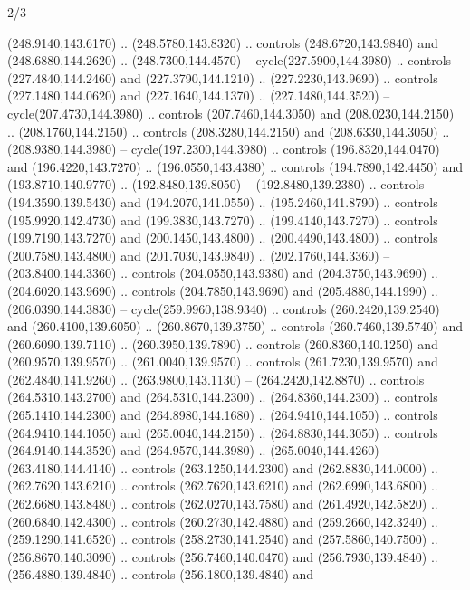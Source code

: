 \begin{flagdescription}{2/3}
\begin{scope}[xshift=0.5\flaglength,yshift=0.5\flagwidth,scale=\flagwidth/259.2]
\begin{scope}[y=0.8pt, x=0.8pt, yscale=-1,shift={(-243,-162)}]
      (248.9140,143.6170) .. (248.5780,143.8320) .. controls (248.6720,143.9840) and
      (248.6880,144.2620) .. (248.7300,144.4570) -- cycle(227.5900,144.3980) ..
      controls (227.4840,144.2460) and (227.3790,144.1210) .. (227.2230,143.9690) ..
      controls (227.1480,144.0620) and (227.1640,144.1370) .. (227.1480,144.3520) --
      cycle(207.4730,144.3980) .. controls (207.7460,144.3050) and
      (208.0230,144.2150) .. (208.1760,144.2150) .. controls (208.3280,144.2150) and
      (208.6330,144.3050) .. (208.9380,144.3980) -- cycle(197.2300,144.3980) ..
      controls (196.8320,144.0470) and (196.4220,143.7270) .. (196.0550,143.4380) ..
      controls (194.7890,142.4450) and (193.8710,140.9770) .. (192.8480,139.8050) --
      (192.8480,139.2380) .. controls (194.3590,139.5430) and (194.2070,141.0550) ..
      (195.2460,141.8790) .. controls (195.9920,142.4730) and (199.3830,143.7270) ..
      (199.4140,143.7270) .. controls (199.7190,143.7270) and (200.1450,143.4800) ..
      (200.4490,143.4800) .. controls (200.7580,143.4800) and (201.7030,143.9840) ..
      (202.1760,144.3360) -- (203.8400,144.3360) .. controls (204.0550,143.9380) and
      (204.3750,143.9690) .. (204.6020,143.9690) .. controls (204.7850,143.9690) and
      (205.4880,144.1990) .. (206.0390,144.3830) -- cycle(259.9960,138.9340) ..
      controls (260.2420,139.2540) and (260.4100,139.6050) .. (260.8670,139.3750) ..
      controls (260.7460,139.5740) and (260.6090,139.7110) .. (260.3950,139.7890) ..
      controls (260.8360,140.1250) and (260.9570,139.9570) .. (261.0040,139.9570) ..
      controls (261.7230,139.9570) and (262.4840,141.9260) .. (263.9800,143.1130) --
      (264.2420,142.8870) .. controls (264.5310,143.2700) and (264.5310,144.2300) ..
      (264.8360,144.2300) .. controls (265.1410,144.2300) and (264.8980,144.1680) ..
      (264.9410,144.1050) .. controls (264.9410,144.1050) and (265.0040,144.2150) ..
      (264.8830,144.3050) .. controls (264.9140,144.3520) and (264.9570,144.3980) ..
      (265.0040,144.4260) -- (263.4180,144.4140) .. controls (263.1250,144.2300) and
      (262.8830,144.0000) .. (262.7620,143.6210) .. controls (262.7620,143.6210) and
      (262.6990,143.6800) .. (262.6680,143.8480) .. controls (262.0270,143.7580) and
      (261.4920,142.5820) .. (260.6840,142.4300) .. controls (260.2730,142.4880) and
      (259.2660,142.3240) .. (259.1290,141.6520) .. controls (258.2730,141.2540) and
      (257.5860,140.7500) .. (256.8670,140.3090) .. controls (256.7460,140.0470) and
      (256.7930,139.4840) .. (256.4880,139.4840) .. controls (256.1800,139.4840) and

\end{scope}
\end{scope}
\end{flagdescription}

